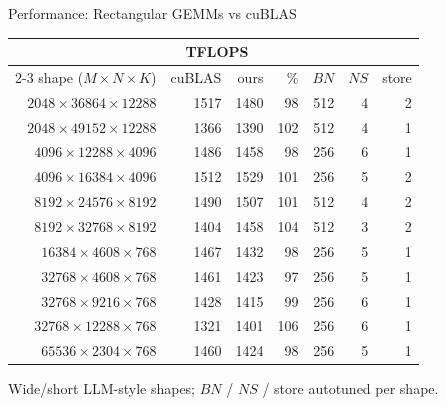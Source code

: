 \documentclass[aspectratio=169,professionalfonts]{beamer}
\begin{document}
\begin{frame}{Performance: Rectangular GEMMs vs cuBLAS}
  \begin{center}\footnotesize
    \setlength{\tabcolsep}{6pt}
    \begin{tabular}{rrrrrrr}
      \toprule
      & \multicolumn{2}{c}{TFLOPS} & & & & \\
      \cmidrule(lr){2-3}
      shape ($M{\times}N{\times}K$) & cuBLAS & ours & \% & $BN$ & $NS$ & store \\
      \midrule
      $2048{\times}36864{\times}12288$ & 1517 & 1480 &  98 & 512 & 4 & 2 \\
      $2048{\times}49152{\times}12288$ & 1366 & 1390 & 102 & 512 & 4 & 1 \\
      $4096{\times}12288{\times}4096$  & 1486 & 1458 &  98 & 256 & 6 & 1 \\
      $4096{\times}16384{\times}4096$  & 1512 & 1529 & 101 & 256 & 5 & 2 \\
      $8192{\times}24576{\times}8192$  & 1490 & 1507 & 101 & 512 & 4 & 2 \\
      $8192{\times}32768{\times}8192$  & 1404 & 1458 & 104 & 512 & 3 & 2 \\
      $16384{\times}4608{\times}768$   & 1467 & 1432 &  98 & 256 & 5 & 1 \\
      $32768{\times}4608{\times}768$   & 1461 & 1423 &  97 & 256 & 5 & 1 \\
      $32768{\times}9216{\times}768$   & 1428 & 1415 &  99 & 256 & 6 & 1 \\
      $32768{\times}12288{\times}768$  & 1321 & 1401 & 106 & 256 & 6 & 1 \\
      $65536{\times}2304{\times}768$   & 1460 & 1424 &  98 & 256 & 5 & 1 \\
      \bottomrule
    \end{tabular}
  \end{center}

  \vspace{0.15cm}
  {\footnotesize Wide/short LLM-style shapes; $BN$ / $NS$ / store autotuned per shape.}
\end{frame}
\end{document}
